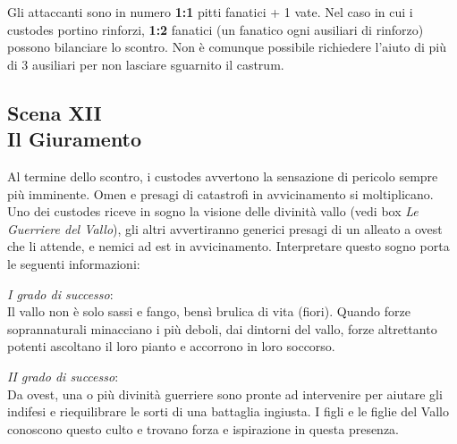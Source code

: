 \documentclass[11.5pt,twocolumn]{article}
\begin{document}
Gli attaccanti sono in numero \textbf{1:1} pitti fanatici + 1 vate.
Nel caso in cui i custodes portino rinforzi, \textbf{1:2} fanatici (un fanatico ogni ausiliari di rinforzo) possono bilanciare lo scontro.
Non \`{e} comunque possibile richiedere l'aiuto di pi\`{u} di 3 ausiliari per non lasciare sguarnito il castrum.

\subsection*{Scena XII\\Il Giuramento}
%
Al termine dello scontro, i custodes avvertono la sensazione di pericolo sempre pi\`{u} imminente.
Omen e presagi di catastrofi in avvicinamento si moltiplicano.
Uno dei custodes riceve in sogno la visione delle divinit\`{a} vallo (vedi box \emph{Le Guerriere del Vallo}), gli altri avvertiranno generici presagi di un alleato a ovest che li attende, e nemici ad est in avvicinamento.
%
Interpretare questo sogno porta le seguenti informazioni:

\emph{I grado di successo}:\\
Il vallo non \`{e} solo sassi e fango, bens\`{i} brulica di vita (fiori).
Quando forze soprannaturali minacciano i pi\`{u} deboli, dai dintorni del vallo, forze altrettanto potenti ascoltano il loro pianto e accorrono in loro soccorso.

\emph{II grado di successo}:\\
Da ovest, una o pi\`{u} divinit\`{a} guerriere sono pronte ad intervenire per aiutare gli indifesi e riequilibrare le sorti di una battaglia ingiusta.
I figli e le figlie del Vallo conoscono questo culto e trovano forza e ispirazione in questa presenza.
\end{document}
